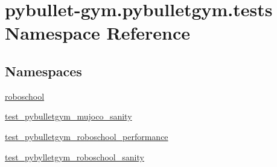 \hypertarget{namespacepybullet-gym_1_1pybulletgym_1_1tests}{}\section{pybullet-\/gym.pybulletgym.\+tests Namespace Reference}
\label{namespacepybullet-gym_1_1pybulletgym_1_1tests}
\subsection*{Namespaces}
\begin{DoxyCompactItemize}
\item 
 \hyperlink{namespacepybullet-gym_1_1pybulletgym_1_1tests_1_1roboschool}{roboschool}
\item 
 \hyperlink{namespacepybullet-gym_1_1pybulletgym_1_1tests_1_1test__pybulletgym__mujoco__sanity}{test\+\_\+pybulletgym\+\_\+mujoco\+\_\+sanity}
\item 
 \hyperlink{namespacepybullet-gym_1_1pybulletgym_1_1tests_1_1test__pybulletgym__roboschool__performance}{test\+\_\+pybulletgym\+\_\+roboschool\+\_\+performance}
\item 
 \hyperlink{namespacepybullet-gym_1_1pybulletgym_1_1tests_1_1test__pybylletgym__roboschool__sanity}{test\+\_\+pybylletgym\+\_\+roboschool\+\_\+sanity}
\end{DoxyCompactItemize}
